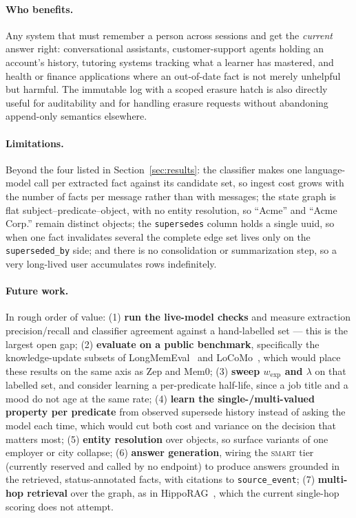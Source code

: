 \documentclass[11pt,a4paper]{article}
\begin{document}
\paragraph{Who benefits.} Any system that must remember a person across
sessions and get the \emph{current} answer right: conversational assistants,
customer-support agents holding an account's history, tutoring systems tracking
what a learner has mastered, and health or finance applications where an
out-of-date fact is not merely unhelpful but harmful. The immutable log with a
scoped erasure hatch is also directly useful for auditability and for handling
erasure requests without abandoning append-only semantics elsewhere.

\paragraph{Limitations.} Beyond the four listed in Section~\ref{sec:results}:
the classifier makes one language-model call per extracted fact against its
candidate set, so ingest cost grows with the number of facts per message rather
than with messages; the state graph is flat subject--predicate--object, with no
entity resolution, so ``Acme'' and ``Acme Corp.'' remain distinct objects; the
\texttt{supersedes} column holds a single uuid, so when one fact invalidates
several the complete edge set lives only on the \texttt{superseded\_by} side;
and there is no consolidation or summarization step, so a very long-lived user
accumulates rows indefinitely.

\paragraph{Future work.} In rough order of value:
(1) \textbf{run the live-model checks} and measure extraction precision/recall
and classifier agreement against a hand-labelled set --- this is the largest
open gap;
(2) \textbf{evaluate on a public benchmark}, specifically the knowledge-update
subsets of LongMemEval~\cite{wu2024longmemeval} and
LoCoMo~\cite{maharana2024locomo}, which would place these results on the same
axis as Zep and Mem0;
(3) \textbf{sweep $w_{\text{exp}}$ and $\lambda$} on that labelled set, and
consider learning a per-predicate half-life, since a job title and a mood do not
age at the same rate;
(4) \textbf{learn the single-/multi-valued property per predicate} from
observed supersede history instead of asking the model each time, which would
cut both cost and variance on the decision that matters most;
(5) \textbf{entity resolution} over objects, so surface variants of one employer
or city collapse;
(6) \textbf{answer generation}, wiring the \textsc{smart} tier (currently
reserved and called by no endpoint) to produce answers grounded in the retrieved,
status-annotated facts, with citations to \texttt{source\_event};
(7) \textbf{multi-hop retrieval} over the graph, as in
HippoRAG~\cite{gutierrez2024hipporag}, which the current single-hop scoring does
not attempt.
\end{document}
